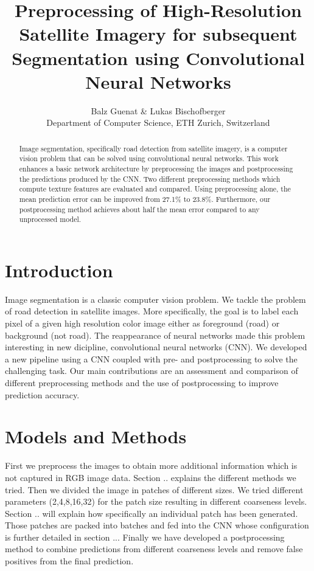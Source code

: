 \documentclass[10pt,conference,compsocconf]{IEEEtran}
\begin{document}
\title{Preprocessing of High-Resolution Satellite Imagery for subsequent \\Segmentation using Convolutional Neural Networks}

\author{
 Balz Guenat \& Lukas Bischofberger\\
  Department of Computer Science, ETH Zurich, Switzerland
}

\maketitle

\begin{abstract}
	Image segmentation, specifically road detection from satellite imagery, is a computer vision problem that can be solved using convolutional neural networks. This work enhances a basic network architecture by preprocessing the images and postprocessing the predictions produced by the CNN. Two different preprocessing methods which compute texture features are evaluated and compared. Using preprocessing alone, the mean prediction error can be improved from 27.1\% to 23.8\%. Furthermore, our postprocessing method achieves about half the mean error compared to any unprocessed model.
\end{abstract}

\section{Introduction}
Image segmentation is a classic computer vision problem. We tackle the problem of road detection in satellite images. More specifically, the goal is to label each pixel of a given high resolution color image either as foreground (road) or background (not road). The reappearance of neural networks made this problem interesting in new dicipline, convolutional neural networks (CNN). We developed a new pipeline using a CNN coupled with pre- and postprocessing to solve the challenging task. Our main contributions are an assessment and comparison of different preprocessing methods and the use of postprocessing to improve prediction accuracy.

\section{Models and Methods}
First we preprocess the images to obtain more additional information which is not captured in RGB image data. Section .. explains the different methods we tried.
Then we divided the image in patches of different sizes. We tried different parameters (2,4,8,16,32) for the patch size resulting in different coarseness levels. Section .. will explain how specifically an individual patch has been generated. Those patches are packed into batches and fed into the CNN whose configuration is further detailed in section ... Finally we have developed a postprocessing method to combine predictions from different coarseness levels and remove false positives from the final prediction.
\end{document}
